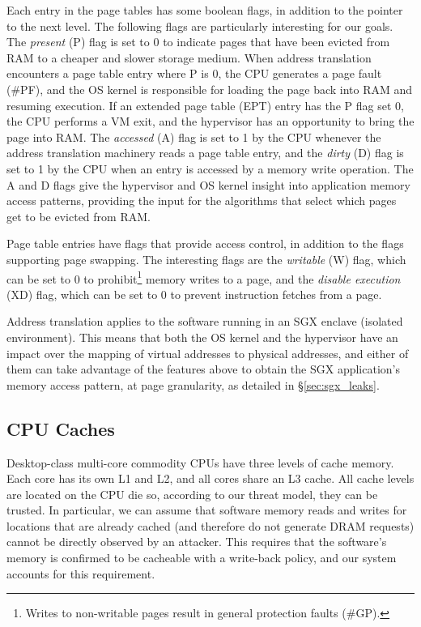 Each entry in the page tables has some boolean flags, in addition to the
pointer to the next level. The following flags are particularly interesting for
our goals. The \textit{present} (P) flag is set to 0 to indicate pages that
have been evicted from RAM to a cheaper and slower storage medium. When address
translation encounters a page table entry where P is 0, the CPU generates a
page fault (\#PF), and the OS kernel is responsible for loading the page back
into RAM and resuming execution. If an extended page table (EPT) entry has the
P flag set 0, the CPU performs a VM exit, and the hypervisor has an opportunity
to bring the page into RAM. The \textit{accessed} (A) flag is set to 1 by the
CPU whenever the address translation machinery reads a page table entry, and
the \textit{dirty} (D) flag is set to 1 by the CPU when an entry is accessed by
a memory write operation. The A and D flags give the hypervisor and OS kernel
insight into application memory access patterns, providing the input for the
algorithms that select which pages get to be evicted from RAM.

Page table entries have flags that provide access control, in addition to the
flags supporting page swapping. The interesting flags are the \textit{writable}
(W) flag, which can be set to 0 to prohibit\footnote{Writes to non-writable
pages result in general protection faults (\#GP).} memory writes to a page, and
the \textit{disable execution} (XD) flag, which can be set to 0 to prevent
instruction fetches from a page.

Address translation applies to the software running in an SGX enclave
(isolated environment). This means that both the OS kernel and the hypervisor
have an impact over the mapping of virtual addresses to physical addresses, and
either of them can take advantage of the features above to obtain the SGX
application's memory access pattern, at page granularity, as detailed in
\S \ref{sec:sgx_leaks}.


\subsection{CPU Caches}
\label{sec:caching}

Desktop-class multi-core commodity CPUs have three levels of cache memory. Each
core has its own L1 and L2, and all cores share an L3 cache. All cache levels
are located on the CPU die so, according to our threat model, they can be
trusted. In particular, we can assume that software memory reads and writes for
locations that are already cached (and therefore do not generate DRAM requests)
cannot be directly observed by an attacker. This requires that the software's
memory is confirmed to be cacheable with a write-back policy, and our system
accounts for this requirement.

